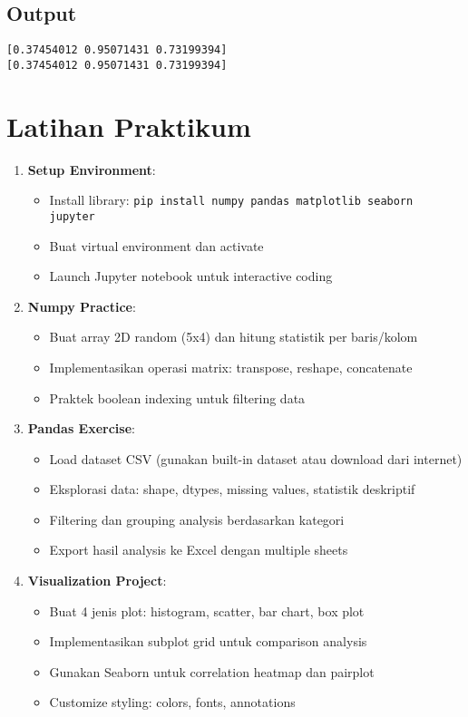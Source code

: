 \subsection*{Output}
\begin{lstlisting}[style=bash]
[0.37454012 0.95071431 0.73199394]
[0.37454012 0.95071431 0.73199394]
\end{lstlisting}


\section{Latihan Praktikum}

\begin{enumerate}
  \item \textbf{Setup Environment}:
  \begin{itemize}
    \item Install library: \texttt{pip install numpy pandas matplotlib seaborn jupyter}
    \item Buat virtual environment dan activate
    \item Launch Jupyter notebook untuk interactive coding
  \end{itemize}

  \item \textbf{Numpy Practice}:
  \begin{itemize}
    \item Buat array 2D random (5x4) dan hitung statistik per baris/kolom
    \item Implementasikan operasi matrix: transpose, reshape, concatenate
    \item Praktek boolean indexing untuk filtering data
  \end{itemize}

  \item \textbf{Pandas Exercise}:
  \begin{itemize}
    \item Load dataset CSV (gunakan built-in dataset atau download dari internet)
    \item Eksplorasi data: shape, dtypes, missing values, statistik deskriptif
    \item Filtering dan grouping analysis berdasarkan kategori
    \item Export hasil analysis ke Excel dengan multiple sheets
  \end{itemize}

  \item \textbf{Visualization Project}:
  \begin{itemize}
    \item Buat 4 jenis plot: histogram, scatter, bar chart, box plot
    \item Implementasikan subplot grid untuk comparison analysis
    \item Gunakan Seaborn untuk correlation heatmap dan pairplot
    \item Customize styling: colors, fonts, annotations
  \end{itemize}


\end{enumerate}
